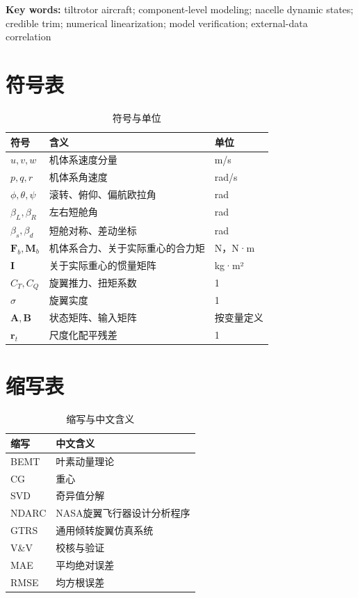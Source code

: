 \documentclass[UTF8,12pt,openany]{ctexbook}
\begin{document}
\textbf{Key words:} tiltrotor aircraft; component-level modeling; nacelle dynamic states; credible trim; numerical linearization; model verification; external-data correlation

\section{符号表}

\begin{longtable}{p{}p{}p{}}
\caption{符号与单位}\label{tab:auto-1}\\
\toprule
符号 & 含义 & 单位 \\
\midrule
$u,v,w$ & 机体系速度分量 & m/s \\
$p,q,r$ & 机体系角速度 & rad/s \\
$\phi,\theta,\psi$ & 滚转、俯仰、偏航欧拉角 & rad \\
$\beta_L,\beta_R$ & 左右短舱角 & rad \\
$\beta_s,\beta_d$ & 短舱对称、差动坐标 & rad \\
$\mathbf F_b,\mathbf M_b$ & 机体系合力、关于实际重心的合力矩 & N，N·m \\
$\mathbf I$ & 关于实际重心的惯量矩阵 & kg·m² \\
$C_T,C_Q$ & 旋翼推力、扭矩系数 & 1 \\
$\sigma$ & 旋翼实度 & 1 \\
$\mathbf A,\mathbf B$ & 状态矩阵、输入矩阵 & 按变量定义 \\
$\mathbf r_t$ & 尺度化配平残差 & 1 \\
\bottomrule
\end{longtable}

\section{缩写表}

\begin{longtable}{p{}p{}}
\caption{缩写与中文含义}\label{tab:auto-2}\\
\toprule
缩写 & 中文含义 \\
\midrule
BEMT & 叶素动量理论 \\
CG & 重心 \\
SVD & 奇异值分解 \\
NDARC & NASA旋翼飞行器设计分析程序 \\
GTRS & 通用倾转旋翼仿真系统 \\
V\&V & 校核与验证 \\
MAE & 平均绝对误差 \\
RMSE & 均方根误差 \\
\bottomrule
\end{longtable}
\end{document}
